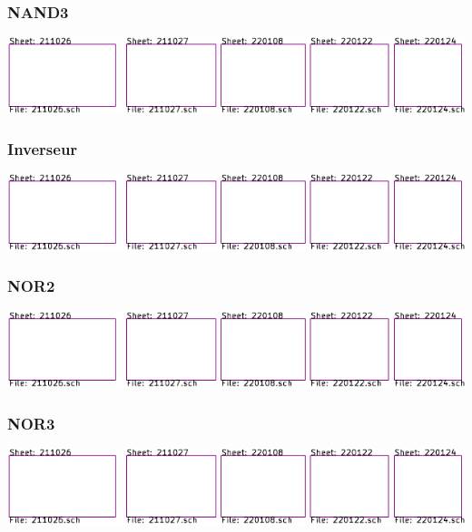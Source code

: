 \documentclass[resume]{subfiles}
\begin{document}
\begin{multicols}{3}
\subsubsection{NAND3}
\begin{center}
\includegraphics[scale=1,page=21]{../kicad/resume-crop.pdf}
\end{center}
\subsubsection{Inverseur}
\begin{center}
\includegraphics[scale=1,page=22]{../kicad/resume-crop.pdf}
\end{center}
\subsubsection{NOR2}
\begin{center}
\includegraphics[scale=1,page=23]{../kicad/resume-crop.pdf}
\end{center}
\subsubsection{NOR3}
\begin{center}
\includegraphics[scale=1,page=24]{../kicad/resume-crop.pdf}
\end{center}






\end{multicols}
\end{document}
